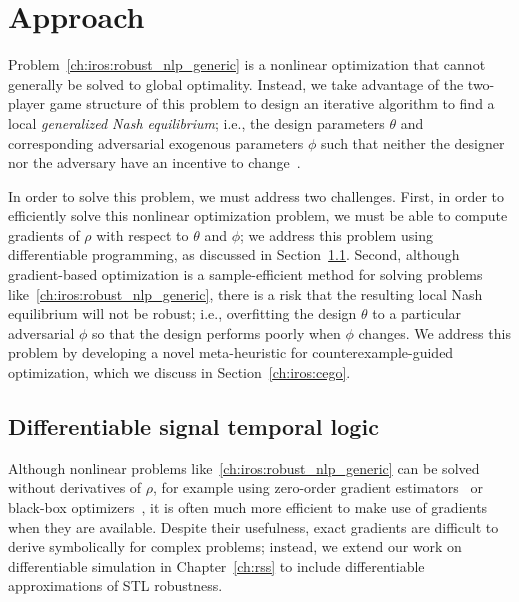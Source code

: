\section{Approach}

Problem~\eqref{ch:iros:robust_nlp_generic} is a nonlinear optimization that cannot generally be solved to global optimality. Instead, we take advantage of the two-player game structure of this problem to design an iterative algorithm to find a local \textit{generalized Nash equilibrium}; i.e., the design parameters $\theta$ and corresponding adversarial exogenous parameters $\phi$ such that neither the designer nor the adversary have an incentive to change~\cite{facchineiGeneralizedNashEquilibrium2007}.

In order to solve this problem, we must address two challenges. First, in order to efficiently solve this nonlinear optimization problem, we must be able to compute gradients of $\rho$ with respect to $\theta$ and $\phi$; we address this problem using differentiable programming, as discussed in Section~\ref{ch:iros:diffstl}. Second, although gradient-based optimization is a sample-efficient method for solving problems like~\eqref{ch:iros:robust_nlp_generic}, there is a risk that the resulting local Nash equilibrium will not be robust; i.e., overfitting the design $\theta$ to a particular adversarial $\phi$ so that the design performs poorly when $\phi$ changes. We address this problem by developing a novel meta-heuristic for counterexample-guided optimization, which we discuss in Section~\ref{ch:iros:cego}.

\subsection{Differentiable signal temporal logic}\label{ch:iros:diffstl}

Although nonlinear problems like~\eqref{ch:iros:robust_nlp_generic} can be solved without derivatives of $\rho$, for example using zero-order gradient estimators~\cite{suh2021_bundled_gradients} or black-box optimizers~\cite{corsoSurveyAlgorithmsBlackBox2021}, it is often much more efficient to make use of gradients when they are available. Despite their usefulness, exact gradients are difficult to derive symbolically for complex problems; instead, we extend our work on differentiable simulation in Chapter~\ref{ch:rss} to include differentiable approximations of STL robustness.

